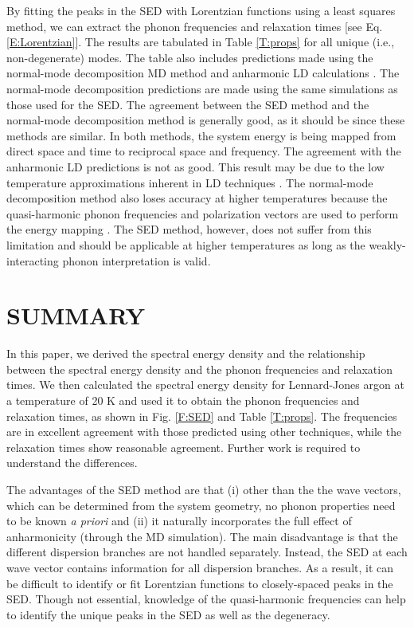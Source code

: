 \documentclass[twocolumn,10pt]{asme2e}
\begin{document}
By fitting the peaks in the SED with Lorentzian functions using a least
squares method, we can extract the phonon frequencies and relaxation times
[see Eq$.$ \eqref{E:Lorentzian}].  The results are tabulated in Table
\ref{T:props} for all unique (i$.$e$.$, non-degenerate) modes.  The table
also includes predictions made using the normal-mode decomposition MD method
\cite{mcgaughey2004c} and anharmonic LD calculations \cite{turney2009a}. The
normal-mode decomposition predictions are made using the same simulations as
those used for the SED.  The agreement between the SED method and the
normal-mode decomposition method is generally good, as it should be since
these methods are similar.  In both methods, the system energy is being
mapped from direct space and time to reciprocal space and frequency.  The
agreement with the anharmonic LD predictions is not as good. This result may
be due to the low temperature approximations inherent in LD techniques
\cite{turney2009a}.  The normal-mode decomposition method also loses accuracy
at higher temperatures because the quasi-harmonic phonon frequencies and
polarization vectors are used to perform the energy mapping
\cite{turney2009a}.  The SED method, however, does not suffer from this
limitation and should be applicable at higher temperatures as long as the
weakly-interacting phonon interpretation is valid.

\section*{SUMMARY}

In this paper, we derived the spectral energy density and the relationship
between the spectral energy density and the phonon frequencies and relaxation
times. We then calculated the spectral energy density for Lennard-Jones argon
at a temperature of 20 K and used it to obtain the phonon frequencies and
relaxation times, as shown in Fig$.$ \ref{F:SED} and Table \ref{T:props}. The
frequencies are in excellent agreement with those predicted using other
techniques, while the relaxation times show reasonable agreement. Further
work is required to understand the differences.

The advantages of the SED method are that (i) other than the the wave
vectors, which can be determined from the system geometry, no phonon
properties need to be known {\em a priori} and (ii) it naturally incorporates
the full effect of anharmonicity (through the MD simulation). The main
disadvantage is that the different dispersion branches are not handled
separately. Instead, the SED at each wave vector contains information for all
dispersion branches. As a result, it can be difficult to identify or fit
Lorentzian functions to closely-spaced peaks in the SED. Though not
essential, knowledge of the quasi-harmonic frequencies can help to identify
the unique peaks in the SED as well as the degeneracy.
\end{document}
